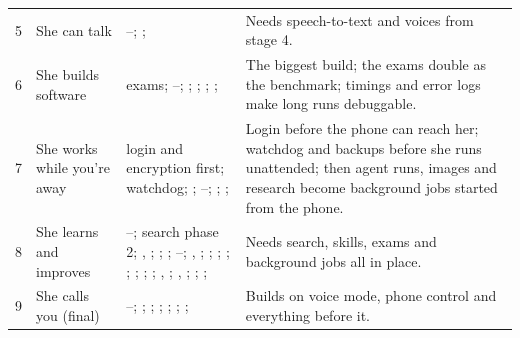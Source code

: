 \begin{table}[t]
\begin{tabularx}{\textwidth}{@{}cL{28mm}YY@{}}
5 & She can talk & --; ;  & Needs speech-to-text and voices from stage 4. \\
6 & She builds software &  exams; --; ; ; ; ;  & The biggest build; the exams double as the benchmark; timings and error logs make long runs debuggable. \\
7 & She works while you're away &  login and encryption first;  watchdog; ; --; ; ;  & Login before the phone can reach her; watchdog and backups before she runs unattended; then agent runs, images and research become background jobs started from the phone. \\
8 & She learns and improves & --; search phase 2; , ; ; ; --; , ; ; ; ; ; ; ; ; , ; , ; ; ;  & Needs search, skills, exams and background jobs all in place. \\
9 & She calls you (final) & --; ; ; ; ; ; ;  & Builds on voice mode, phone control and everything before it. \\
\bottomrule
\end{tabularx}
\end{table}

